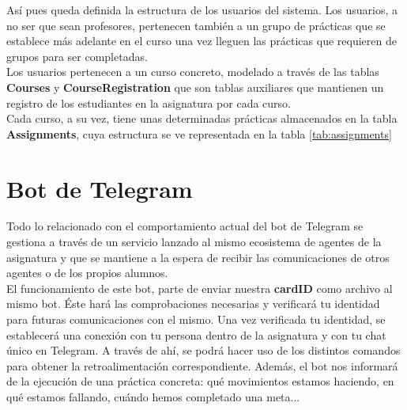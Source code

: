 \begin{table}[]
\centering
{}
\caption{Columna adicional en la tabla \textbf{Users} de la base de datos}
\label{tab:usersdb2}
\end{table}

Así pues queda definida la estructura de los usuarios del sistema. Los usuarios, a no ser que sean profesores, pertenecen también a un grupo de prácticas que se establece más adelante en el curso una vez lleguen las prácticas que requieren de grupos para ser completadas.\\

Los usuarios pertenecen a un curso concreto, modelado a través de las tablas \textbf{Courses} y \textbf{CourseRegistration} que son tablas auxiliares que mantienen un registro de los estudiantes en la asignatura por cada curso.\\

Cada curso, a su vez, tiene unas determinadas prácticas almacenados en la tabla \textbf{Assignments}, cuya estructura se ve representada en la tabla \ref{tab:assignments}

\section{Bot de Telegram}

Todo lo relacionado con el comportamiento actual del bot de Telegram se gestiona a través de un servicio lanzado al mismo ecosistema de agentes de la asignatura y que se mantiene a la espera de recibir las comunicaciones de otros agentes o de los propios alumnos.\\

El funcionamiento de este bot, parte de enviar nuestra \textbf{cardID} como archivo al mismo bot. Éste hará las comprobaciones necesarias y verificará tu identidad para futuras comunicaciones con el mismo. Una vez verificada tu identidad, se establecerá una conexión con tu persona dentro de la asignatura y con tu chat único en Telegram. A través de ahí, se podrá hacer uso de los distintos comandos para obtener la retroalimentación correspondiente. Además, el bot nos informará de la ejecución de una práctica concreta: qué movimientos estamos haciendo, en qué estamos fallando, cuándo hemos completado una meta...